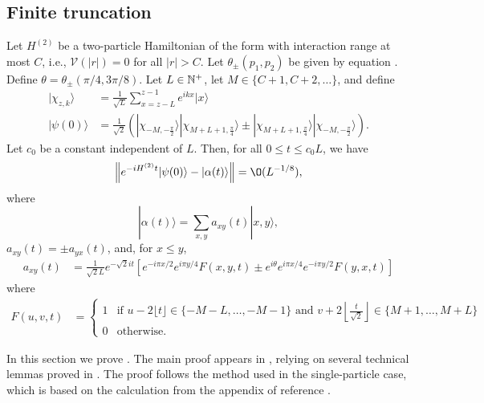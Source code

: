 \documentclass[../thesis-main/thesis-main]{subfiles}
\begin{document}

\subsection{Finite truncation}


\begin{theorem}
\label{thm:twopart}Let $H^{(2)}$ be a two-particle Hamiltonian of the form  with interaction range at most $C$, i.e., $\mathcal{V}(|r|)=0$ for all $|r|>C$. Let $\theta_{\pm}(p_1,p_2)$ be given by equation . Define $\theta=\theta_{\pm}({\pi}/{4},{3\pi}/{8})$. Let $L\in\mathbb{N}^+$, let $M\in\{C+1,C+2,\ldots\}$, and define
\begin{align*}
|\chi_{z,k}\rangle & =  \frac{1}{\sqrt{L}}\sum_{x=z-L}^{z-1}e^{ikx}|x\rangle\\
|\psi(0)\rangle & =  \frac{1}{\sqrt{2}}\left(|\chi_{-M,-\frac{\pi}{2}}\rangle|\chi_{M+L+1,\frac{\pi}{4}}\rangle 
	\pm |\chi_{M+L+1,\frac{\pi}{4}}\rangle|\chi_{-M,-\frac{\pi}{2}}\rangle\right).
\end{align*}
Let $c_{0}$ be a constant independent of $L$. Then, for all $0\leq t\leq c_{0}L$, we have
\[
\left\Vert e^{-iH^{(2)}t}|\psi(0)\rangle-|\alpha(t)\rangle\right\Vert =\O(L^{-{1}/{8}}),
\]
where 
\begin{equation}
|\alpha(t)\rangle=\sum_{x,y}a_{xy}(t)|x,y\rangle,
\label{eq:alpha}
\end{equation}
$a_{xy}(t)=\pm a_{yx}(t)$, and, for $x\leq y$, 
\begin{align}
a_{xy}(t) & =  \frac{1}{\sqrt{2}L}e^{-\sqrt{2}it}\left[e^{-i \pi x/2} e^{i \pi y/4} F(x,y,t) 
    \pm e^{i\theta} e^{i \pi x/4} e^{-i \pi y/2} F(y,x,t) \right]
\label{eq:a_xy}
\end{align}
where
\begin{align*}
F(u,v,t) & =  \begin{cases}
	1 & \text{if }u-2 \lfloor t \rfloor\in\{-M-L,\ldots,-M-1\}\text{ and }v+2\left\lfloor \frac{t}{\sqrt{2}}
	\right\rfloor \in\{M+1,\ldots,M+L\}\\
	0 & \text{otherwise.}\end{cases}
\end{align*}
\end{theorem}

In this section we prove . The main proof appears in , relying on several technical lemmas proved in . The proof follows the method used in the single-particle case, which is based on the calculation from the appendix of reference \cite{FGG08}.
\end{document}
